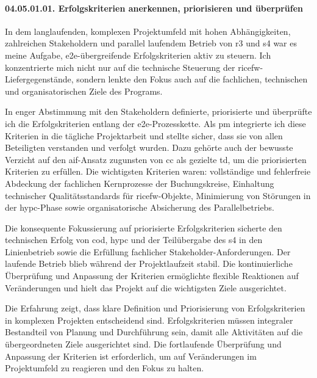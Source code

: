 \paragraph*{04.05.01.01. Erfolgskriterien anerkennen, priorisieren und überprüfen}
\label{para:04.05.01.01_ErfolgskriterienAnerkennenPriorisierenUndÜberprüfen}

\par In dem langlaufenden, komplexen Projektumfeld mit hohen Abhängigkeiten, zahlreichen Stakeholdern und parallel laufendem Betrieb von \gls{r3} und \gls{s4} war es meine Aufgabe, \gls{e2e}-übergreifende Erfolgskriterien aktiv zu steuern. Ich konzentrierte mich nicht nur auf die technische Steuerung der \gls{ricefw}-Liefergegenstände, sondern lenkte den Fokus auch auf die fachlichen, technischen und organisatorischen Ziele des Programs.

\par In enger Abstimmung mit den Stakeholdern definierte, priorisierte und überprüfte ich die Erfolgskriterien entlang der \gls{e2e}-Prozesskette. Als \gls{pm} integrierte ich diese Kriterien in die tägliche Projektarbeit und stellte sicher, dass sie von allen Beteiligten verstanden und verfolgt wurden. Dazu gehörte auch der bewusste Verzicht auf den \gls{aif}-Ansatz zugunsten von \gls{cc} als gezielte \gls{td}, um die priorisierten Kriterien zu erfüllen. Die wichtigsten Kriterien waren: vollständige und fehlerfreie Abdeckung der fachlichen Kernprozesse der Buchungskreise, Einhaltung technischer Qualitätsstandards für \gls{ricefw}-Objekte, Minimierung von Störungen in der \gls{hypc}-Phase sowie organisatorische Absicherung des Parallelbetriebs.

\par Die konsequente Fokussierung auf priorisierte Erfolgskriterien sicherte den technischen Erfolg von \gls{cod}, \gls{hypc} und der Teilübergabe des \gls{s4} in den Linienbetrieb sowie die Erfüllung fachlicher Stakeholder-Anforderungen. Der laufende Betrieb blieb während der Projektlaufzeit stabil. Die kontinuierliche Überprüfung und Anpassung der Kriterien ermöglichte flexible Reaktionen auf Veränderungen und hielt das Projekt auf die wichtigsten Ziele ausgerichtet.

\par Die Erfahrung zeigt, dass klare Definition und Priorisierung von Erfolgskriterien in komplexen Projekten entscheidend sind. Erfolgskriterien müssen integraler Bestandteil von Planung und Durchführung sein, damit alle Aktivitäten auf die übergeordneten Ziele ausgerichtet sind. Die fortlaufende Überprüfung und Anpassung der Kriterien ist erforderlich, um auf Veränderungen im Projektumfeld zu reagieren und den Fokus zu halten.